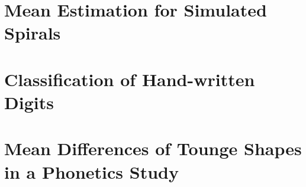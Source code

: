 \label{sec:4}

\section{Mean Estimation for Simulated Spirals}
\label{sec:4-spirals}

\section{Classification of Hand-written Digits}
\label{sec:4-digits}

\section{Mean Differences of Tounge Shapes in a Phonetics Study}
\label{sec:4-tounges}
